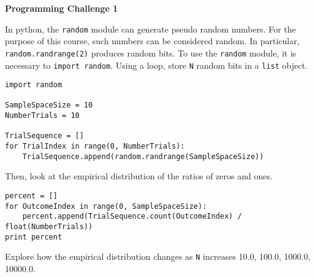 \documentclass[11pt]{article}
\begin{document}
\begin{center}
{\bfseries \LARGE Programming Challenge 1}
\end{center}

In python, the \texttt{random} module can generate pseudo random numbers.
For the purpose of this course, such numbers can be considered random.
In particular, \texttt{random.randrange(2)} produces random bits.
To use the \texttt{random} module, it is necessary to \texttt{import random}.
Using a loop, store \texttt{N} random bits in a \texttt{list} object.
\begin{verbatim}
import random

SampleSpaceSize = 10
NumberTrials = 10

TrialSequence = []
for TrialIndex in range(0, NumberTrials):
    TrialSequence.append(random.randrange(SampleSpaceSize))
\end{verbatim}
Then, look at the empirical distribution of the ratios of zeros and ones.
\begin{verbatim}
percent = []
for OutcomeIndex in range(0, SampleSpaceSize):
    percent.append(TrialSequence.count(OutcomeIndex) / float(NumberTrials))
print percent
\end{verbatim}
Explore how the empirical distribution changes as \texttt{N} increases 10.0, 100.0, 1000.0, 10000.0.
\end{document}
